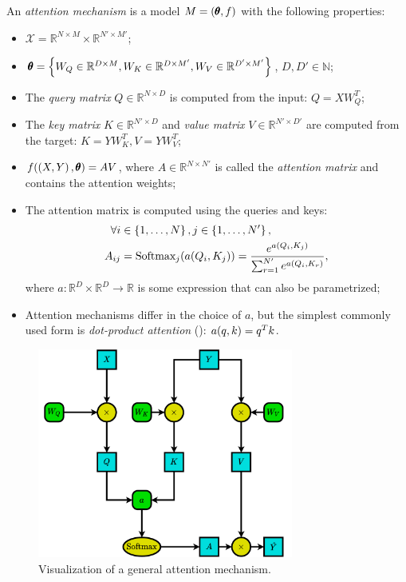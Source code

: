\begin{definition}
An \emph{attention mechanism} is a model $M=\mathopen{}\left(\pmb{\theta}, f\right)$ with the following properties:
\begin{itemize}
\item $\mathcal{X}=\mathbb{R}^{N \times M} \times \mathbb{R}^{N' \times M'}$; 
\item $\pmb{\theta}=\mathopen{}\left\{W_Q \in \mathbb{R}^{D \times M}, W_K \in \mathbb{R}^{D \times M'}, W_V \in \mathbb{R}^{D' \times M'}\right\}$, $D, D' \in \mathbb{N}$;
\item The \emph{query matrix} $Q \in \mathbb{R}^{N \times D}$ is computed from the input: $Q = X W_Q^T$;
\item The \emph{key matrix} $K \in \mathbb{R}^{N' \times D}$ and \emph{value matrix} $V \in \mathbb{R}^{N' \times D'}$ are computed from the target: $K=Y W_K^T, V=Y W_V^T$;
\item $f\mathopen{}\left(\mathopen{}\left(X, Y\right), \pmb{\theta}\right) = A V$, where $A \in \mathbb{R}^{N \times N'}$ is called the \emph{attention matrix} and contains the attention weights;
\item The attention matrix is computed using the queries and keys: 
\begin{align}
\begin{split}
\forall i &\in \mathopen{}\left\{1,\dots,N\right\}, j \in \mathopen{}\left\{1,\dots,N'\right\}, \\
A_{ij}&=\text{Softmax}_j\mathopen{}\left(a\mathopen{}\left(Q_i,K_j\right)\right)=\frac{e^{a\mathopen{}\left(Q_i,K_j\right)}}{\sum_{r=1}^{N'}{e^{a\mathopen{}\left(Q_i,K_r\right)}}},
\end{split}
\end{align}
where $a: \mathbb{R}^D \times \mathbb{R}^D \to \mathbb{R}$ is some expression that can also be parametrized;
\item Attention mechanisms differ in the choice of $a$, but the simplest commonly used form is \emph{dot-product attention} (\cite{luong_effective_2015}): $a\mathopen{}\left(q, k\right)=q^T k$.
\end{itemize}
\end{definition}

\begin{figure}[H]
\centering
\includegraphics[width=0.75\textwidth]{figures/background/attention.pdf}
\caption[Visualization of a general attention mechanism.]{Visualization of a general attention mechanism.}
\label{fig:attention}
\end{figure}

